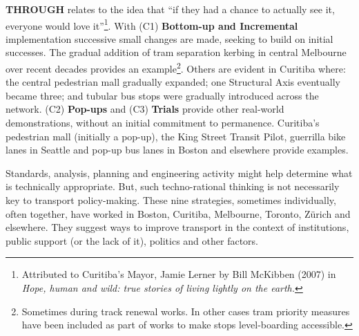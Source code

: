 \documentclass{tufte-handout}
\begin{document}
 \textbf{THROUGH}  relates to the idea that “if they had a chance to actually see it, everyone would love it”\footnote{Attributed to Curitiba's Mayor, Jamie Lerner by Bill McKibben (2007) in \emph{Hope, human and wild: true stories of living lightly on the earth.}}. With (C1) \textbf{Bottom-up and Incremental} implementation successive small changes are made, seeking to build on initial successes. The gradual addition of tram separation kerbing in central Melbourne over recent decades provides an example\footnote{Sometimes during track renewal works.   In other cases tram priority measures have been included as part of works to make stops level-boarding accessible.}. Others are evident in Curitiba where: the central pedestrian mall gradually expanded; one Structural Axis eventually became three; and tubular bus stops were gradually introduced across the network. (C2) \textbf{Pop-ups} and (C3) \textbf{Trials} provide other real-world demonstrations, without an initial commitment to permanence.  Curitiba's pedestrian mall (initially a pop-up), the King Street Transit Pilot, guerrilla bike lanes in Seattle\cite{Fucoloro:2013aa} and pop-up bus lanes in Boston and elsewhere\cite{Transportation-Studies:2019aa} provide examples.

Standards, analysis, planning and engineering activity might help determine what is technically appropriate. But, such techno-rational thinking is not necessarily key to transport policy-making\cite{Marsden:2017aa}. These nine strategies, sometimes individually, often together, have worked in Boston, Curitiba, Melbourne, Toronto, Zürich and elsewhere. They suggest ways to improve transport in the context of institutions, public support (or the lack of it), politics and other factors. 


\end{document}
